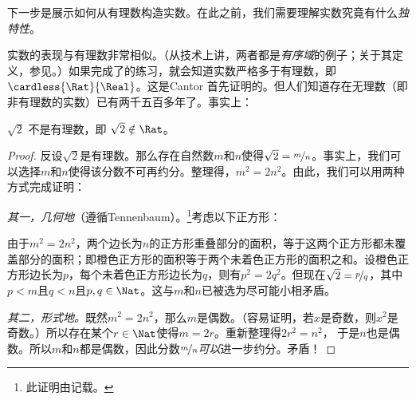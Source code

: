 \documentclass[../../../include/open-logic-section]{subfiles}
\begin{document}

下一步是展示如何从有理数构造实数。在此之前，我们需要理解实数究竟有什么\emph{独特性}。

实数的表现与有理数非常相似。（从技术上讲，两者都是\emph{有序域}的例子；关于其定义，参见。）如果完成了的练习，就会知道实数严格多于有理数，即$\cardless{\Rat}{\Real}$。这是Cantor 首先证明的。但人们知道存在无理数（即非有理数的实数）已有两千五百多年了。事实上：

\begin{thm}
$\sqrt{2}$ 不是有理数，即 $\sqrt{2} \notin \Rat$。
\end{thm}

\begin{proof}
反设$\sqrt{2}$是有理数。那么存在自然数$m$和$n$使得$\sqrt{2} =
\nicefrac{m}{n}$。事实上，我们可以选择$m$和$n$使得该分数不可再约分。整理得，$m^{2} = 2n^{2}$。由此，我们可以用两种方式完成证明：

\emph{其一，几何地}（遵循Tennenbaum）。\footnote{此证明由\cite{Conway2006}记载。}考虑以下正方形：
\begin{center}
\end{center}
由于$m^2 = 2n^2$，两个边长为$n$的正方形重叠部分的面积，等于这两个正方形都未覆盖部分的面积；即橙色正方形的面积等于两个未着色正方形的面积之和。设橙色正方形边长为$p$，每个未着色正方形边长为$q$，则有$p^2 = 2q^2$。但现在$\sqrt{2} = \nicefrac{p}{q}$，其中$p < m$且$q < n$且$p, q \in \Nat$。这与$m$和$n$已被选为尽可能小相矛盾。

\emph{其二，形式地。}既然$m^{2} = 2n^{2}$，那么$m$是偶数。（容易证明，若$x$是奇数，则$x^2$是奇数。）所以存在某个$r \in \Nat$使得$m = 2r$。重新整理得$2r^2 = n^2$，
于是$n$也是偶数。所以$m$和$n$都是偶数，因此分数$\nicefrac{m}{n}$\emph{可以}进一步约分。矛盾！
\end{proof}
\end{document}
